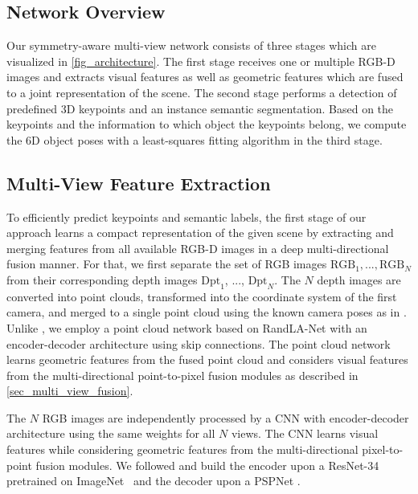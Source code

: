 \subsection{Network Overview}

Our symmetry-aware multi-view network consists of three stages which are visualized in \cref{fig_architecture}. 
The first stage receives one or multiple RGB-D images and extracts visual features as well as geometric features which are fused to a joint representation of the scene. 
The second stage performs a detection of predefined 3D keypoints and an instance semantic segmentation.
Based on the keypoints and the information to which object the keypoints belong, we compute the 6D object poses with a least-squares fitting algorithm \cite{leastSquares} in the third stage.



\subsection{Multi-View Feature Extraction}

To efficiently predict keypoints and semantic labels, the first stage of our approach learns a compact representation of the given scene by extracting and merging features from all available RGB-D images in a deep multi-directional fusion manner. For that, we first separate the set of RGB images $\text{RGB}_1, ..., \text{RGB}_N$ from their corresponding depth images $\text{Dpt}_1$, ..., $\text{Dpt}_N$. The $N$ depth images are converted into point clouds, transformed into the coordinate system of the first camera, and merged to a single point cloud using the known camera poses as in \cite{mv6d}. 
Unlike \cite{mv6d}, we employ a point cloud network based on RandLA-Net \cite{hu2020randla} with an encoder-decoder architecture using skip connections.
The point cloud network learns geometric features from the fused point cloud and considers visual features from the multi-directional point-to-pixel fusion modules as described in \cref{sec_multi_view_fusion}.

The $N$ RGB images are independently processed by a CNN with encoder-decoder architecture using the same weights for all $N$ views. The CNN learns visual features while considering geometric features from the multi-directional pixel-to-point fusion modules. We followed \cite{ffb6d} and build the encoder upon a ResNet-34 \cite{resnet} pretrained on ImageNet~\cite{imagenet} and the decoder upon a PSPNet \cite{pspnet}. 

